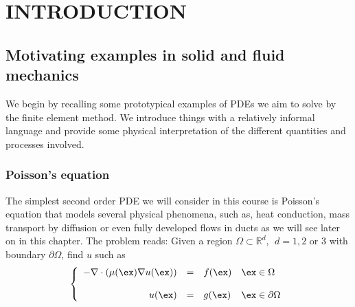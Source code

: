 \setchapterpreamble[u]{\margintoc}
\chapter{INTRODUCTION}


\section{Motivating examples in solid and fluid mechanics}

We begin by recalling some prototypical examples of PDEs
we aim to solve by the finite element method.
We introduce things with a relatively informal language
and provide some physical interpretation of the different
quantities and processes involved.

\subsection{Poisson's equation} 

The simplest second order PDE we will consider in this course is
Poisson's equation that models several physical phenomena, such as,
heat conduction, mass transport by diffusion or even
fully developed flows in ducts as we will see later on in this
chapter. The problem reads: Given a region $\Omega \subset \mathbb{R}^d,~~d=1,2$ or $3$
with boundary $\partial{\Omega}$, find $u$ such as
\begin{equation}
\left \{
\begin{array}{rcll}
-\nabla \cdot \left ( \mu(\ex) \nabla{u}(\ex) \right) & = & f(\ex) & \ex \in \Omega \\
& & & \\
u(\ex) & = & g(\ex) & \ex \in \partial{\Omega}
\end{array}
\right.
\end{equation}

